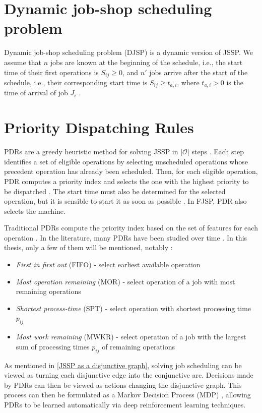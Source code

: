\section{Dynamic job-shop scheduling problem}

Dynamic job-shop scheduling problem (DJSP) is a dynamic version of JSSP. We assume that $n$ jobs are known at the beginning of the schedule, i.e., the start time of their first operations is $S_{ij} \geq 0$, and $n'$ jobs arrive after the start of the schedule, i.e., their corresponding start time is $S_{ij} \geq t_{a,i}$, where $t_{a,i} > 0$ is the time of arrival of job $J_i$ \cite{KUNDAKCI201631, Haupt_1989a}.

\section{Priority Dispatching Rules} \label{priority dispatching rules}
PDRs are a greedy heuristic method for solving JSSP in $\left|\mathcal{O}\right|$ steps \cite{zhang2020learning}. Each step identifies a set of eligible operations by selecting unscheduled operations whose precedent operation has already been scheduled. Then, for each eligible operation, PDR computes a priority index and selects the one with the highest priority to be dispatched \cite{zhang2020learning}. The start time must also be determined for the selected operation, but it is sensible to start it as soon as possible \cite{discovering_dispatching_rules}. In FJSP, PDR also selects the machine.
\par
Traditional PDRs compute the priority index based on the set of features for each operation \cite{Haupt_1989a}. In the literature, many PDRs have been studied over time \cite{doi:10.1080/00207543.2011.611539, Haupt_1989a, discovering_dispatching_rules, 7232991}. In this thesis, only a few of them will be mentioned, notably \cite{10226873, Haupt_1989a}:
\begin{itemize}
    \item \textit{First in first out} (FIFO) - select earliest available operation 
    \item \textit{Most operation remaining} (MOR) - select operation of a job with most remaining operations
    \item \textit{Shortest process-time} (SPT) - select operation with shortest processing time $p_{ij}$
    \item \textit{Most work remaining} (MWKR) - select operation of a job with the largest sum of processing times $p_{ij}$ of remaining operations
\end{itemize}
As mentioned in \ref{JSSP as a disjunctive graph}, solving job scheduling can be viewed as turning each disjunctive edge into the conjunctive arc. Decisions made by PDRs can then be viewed as actions changing the disjunctive graph. This process can then be formulated as a Markov Decision Process (MDP) \cite{zhang2020learning, jssp_rl_env}, allowing PDRs to be learned automatically via deep reinforcement learning techniques.

